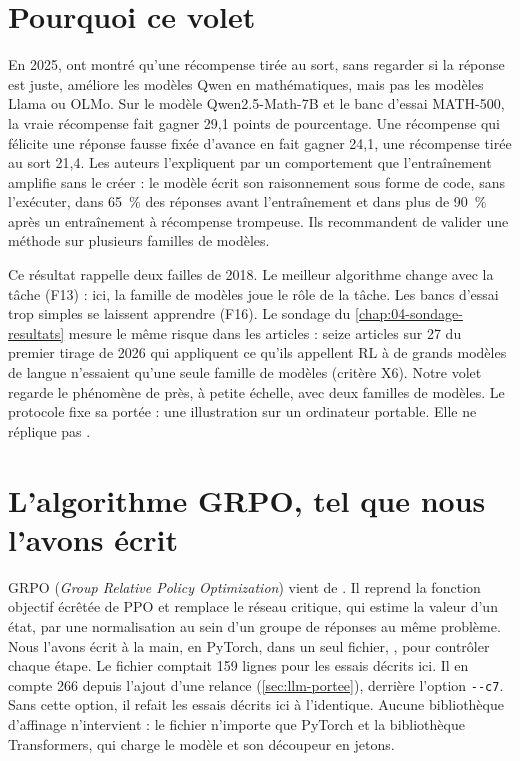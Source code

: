 \section{Pourquoi ce volet}
\label{sec:llm-pourquoi}

En 2025, \textcite{shao2025spurious} ont montré qu'une récompense tirée au sort, sans regarder si la
réponse est juste, améliore les modèles Qwen en mathématiques, mais pas les modèles Llama ou OLMo.
Sur le modèle Qwen2.5-Math-7B et le banc d'essai MATH-500, la vraie récompense fait gagner
29,1 points de pourcentage. Une récompense qui félicite une réponse fausse fixée d'avance en fait
gagner 24,1, une récompense tirée au sort 21,4. Les auteurs l'expliquent par un comportement que
l'entraînement amplifie sans le créer : le modèle écrit son raisonnement sous forme de code, sans
l'exécuter, dans 65~\% des réponses avant l'entraînement et dans plus de 90~\% après un entraînement
à récompense trompeuse. Ils recommandent de valider une méthode sur plusieurs familles de modèles.

Ce résultat rappelle deux failles de 2018. Le meilleur algorithme change avec la tâche (F13) : ici, la
famille de modèles joue le rôle de la tâche. Les bancs d'essai trop simples se laissent apprendre (F16). Le
sondage du \cref{chap:04-sondage-resultats}
mesure le même risque dans les articles : seize articles sur 27 du premier tirage de 2026 qui
appliquent ce qu'ils appellent RL à de grands modèles de langue n'essaient qu'une seule famille de
modèles (critère X6). Notre volet regarde le phénomène de près, à petite échelle, avec deux familles
de modèles. Le protocole fixe sa portée : une illustration sur un ordinateur portable. Elle ne
réplique pas \textcite{shao2025spurious}.

\section{L'algorithme GRPO, tel que nous l'avons écrit}
\label{sec:grpo}

GRPO (\emph{Group Relative Policy Optimization}) vient de \textcite{shao2024deepseekmath}. Il
reprend la fonction objectif écrêtée de PPO \parencite{schulman2017ppo} et remplace le réseau
critique, qui estime la valeur d'un état, par une normalisation au sein d'un groupe de réponses au
même problème. Nous l'avons écrit à la main, en PyTorch, dans un seul fichier, , pour
contrôler chaque étape. Le fichier comptait 159 lignes pour les essais décrits ici. Il en compte 266 depuis
l'ajout d'une relance (\cref{sec:llm-portee}), derrière l'option \texttt{-{}-c7}. Sans cette option, il refait
les essais décrits ici à l'identique. Aucune bibliothèque d'affinage n'intervient :
le fichier n'importe que PyTorch et la bibliothèque Transformers, qui charge le modèle et son
découpeur en jetons.

